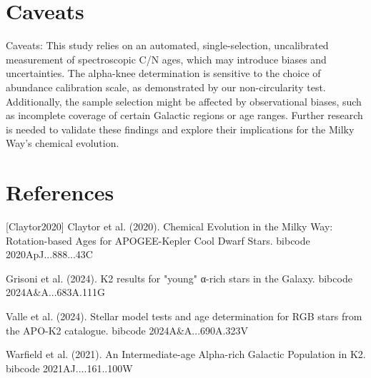\documentclass[twocolumn]{aastex631}
\begin{document}
\section{Caveats}
Caveats: This study relies on an automated, single-selection, uncalibrated measurement of spectroscopic C/N ages, which may introduce biases and uncertainties. The alpha-knee determination is sensitive to the choice of abundance calibration scale, as demonstrated by our non-circularity test. Additionally, the sample selection might be affected by observational biases, such as incomplete coverage of certain Galactic regions or age ranges. Further research is needed to validate these findings and explore their implications for the Milky Way's chemical evolution.
\section*{References}
\footnotesize
[Claytor2020] Claytor et al. (2020). Chemical Evolution in the Milky Way: Rotation-based Ages for APOGEE-Kepler Cool Dwarf Stars. bibcode 2020ApJ...888...43C \par [Grisoni2024] Grisoni et al. (2024). K2 results for "young" α-rich stars in the Galaxy. bibcode 2024A\&A...683A.111G \par [Valle2024] Valle et al. (2024). Stellar model tests and age determination for RGB stars from the APO-K2 catalogue. bibcode 2024A\&A...690A.323V \par [Warfield2021] Warfield et al. (2021). An Intermediate-age Alpha-rich Galactic Population in K2. bibcode 2021AJ....161..100W
\end{document}

